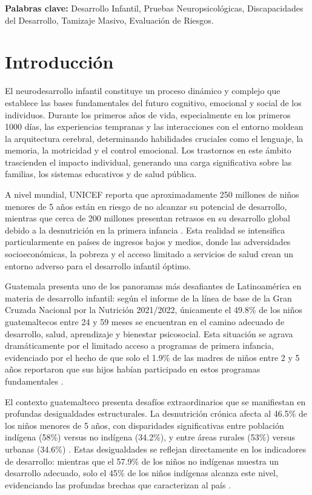 \documentclass[11pt,letterpaper]{report}
\begin{document}
\textbf{Palabras clave:} Desarrollo Infantil, Pruebas Neuropsicológicas, 
Discapacidades del Desarrollo, Tamizaje Masivo, Evaluación de Riesgos.

\tableofcontents

\clearpage
{}
\setcounter{page}{1}

\chapter{Introducción}
El neurodesarrollo infantil constituye un proceso dinámico y complejo que 
establece las bases fundamentales del futuro cognitivo, emocional y social de 
los individuos. Durante los primeros años de vida, especialmente en los 
primeros 1000 días, las experiencias tempranas y las interacciones con el 
entorno moldean la arquitectura cerebral, determinando habilidades cruciales 
como el lenguaje, la memoria, la motricidad y el control emocional. Los 
trastornos en este ámbito trascienden el impacto individual, generando una 
carga significativa sobre las familias, los sistemas educativos y de salud 
pública.

A nivel mundial, UNICEF reporta que aproximadamente 250 millones de niños
menores  de 5 años están en riesgo de no alcanzar su potencial de desarrollo,
mientras  que cerca de 200 millones presentan retrasos en su desarrollo global
debido a  la desnutrición en la primera infancia \cite{UNICEF2023}. Esta
realidad se  intensifica particularmente en países de ingresos bajos y medios,
donde las  adversidades socioeconómicas, la pobreza y el acceso limitado a
servicios de  salud crean un entorno adverso para el desarrollo infantil óptimo.

Guatemala presenta uno de los panoramas más desafiantes de Latinoamérica en
materia de desarrollo infantil: según el informe de la línea de base 
de la Gran Cruzada Nacional por la Nutrición 2021/2022, únicamente el 49.8\% 
de los niños guatemaltecos entre 24 y 59 meses se encuentran en el camino 
adecuado de desarrollo, salud, aprendizaje y bienestar psicosocial. Esta 
situación se agrava dramáticamente por el limitado acceso a programas de 
primera infancia, evidenciado por el hecho de que solo el 1.9\% de las madres 
de niños entre 2 y 5 años reportaron que sus hijos habían participado en estos 
programas fundamentales \cite{SESAN2022}.

El contexto guatemalteco presenta desafíos extraordinarios que se manifiestan 
en profundas desigualdades estructurales. La desnutrición crónica afecta al 
46.5\% de los niños menores de 5 años, con disparidades significativas entre 
población indígena (58\%) versus no indígena (34.2\%), y entre áreas rurales 
(53\%) versus urbanas (34.6\%) \cite{EnMaternoInfantil}. Estas desigualdades 
se reflejan directamente en los indicadores de desarrollo: mientras que el 
57.9\% de los niños no indígenas muestra un desarrollo adecuado, solo el 45\% 
de los niños indígenas alcanza este nivel, evidenciando las profundas brechas 
que caracterizan al país \cite{SESAN2022}.
\end{document}
